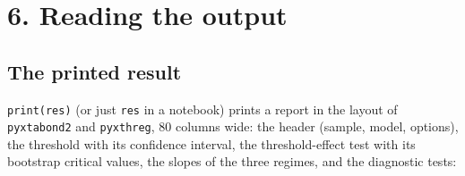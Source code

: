 \documentclass[
  10.5pt,
  a4paper,
]{article}
\begin{document}
\section{6. Reading the output}\label{reading-the-output}

\subsection{The printed result}\label{the-printed-result}

\texttt{print(res)} (or just \texttt{res} in a notebook) prints a report
in the layout of \texttt{pyxtabond2} and \texttt{pyxthreg}, 80 columns
wide: the header (sample, model, options), the threshold with its
confidence interval, the threshold-effect test with its bootstrap
critical values, the slopes of the three regimes, and the diagnostic
tests:
\end{document}
